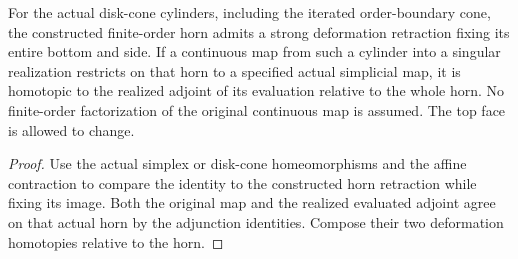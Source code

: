 \begin{proposition}
  \label{prop:actual-singular-horn-relative-canonicalization}
  \leanok
  For the actual disk-cone cylinders, including the iterated order-boundary cone, the constructed finite-order horn admits a strong deformation retraction fixing its entire bottom and side. If a continuous map from such a cylinder into a singular realization restricts on that horn to a specified actual simplicial map, it is homotopic to the realized adjoint of its evaluation relative to the whole horn. No finite-order factorization of the original continuous map is assumed. The top face is allowed to change.
\end{proposition}
\begin{proof}
  Use the actual simplex or disk-cone homeomorphisms and the affine contraction to compare the identity to the constructed horn retraction while fixing its image. Both the original map and the realized evaluated adjoint agree on that actual horn by the adjunction identities. Compose their two deformation homotopies relative to the horn.
  \leanok
\end{proof}

